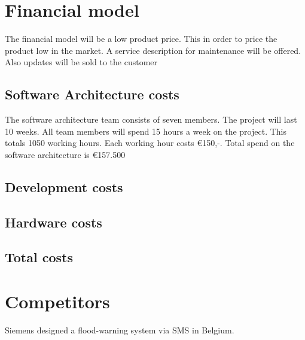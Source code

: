 \section{Financial model}
The financial model will be a low product price. This in order to price the product low in the market. A service description for maintenance will be offered. Also updates will be sold to the customer

\subsection{Software Architecture costs}
The software architecture team consists of seven members. The project will last 10 weeks. All team members will spend 15 hours a week on the project. This totals 1050 working hours. Each working hour costs \euro{}150,-. Total spend on the software architecture is \euro{}157.500
\subsection{Development costs}

\subsection{Hardware costs}

\subsection{Total costs}


\section{Competitors}
Siemens designed a flood-warning system via SMS in Belgium.

